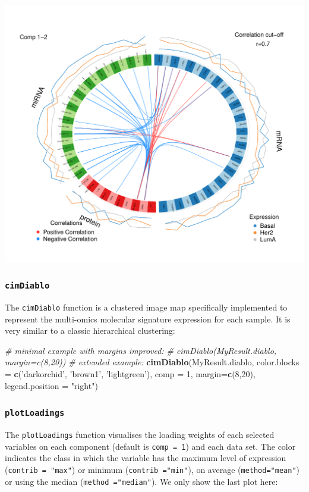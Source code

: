 \documentclass[]{book}
\newenvironment{Shaded}{\begin{snugshade}}{\end{snugshade}}
\newcommand{\CommentTok}[1]{\textcolor[rgb]{0.56,0.35,0.01}{\textit{#1}}}
\newcommand{\DataTypeTok}[1]{\textcolor[rgb]{0.13,0.29,0.53}{#1}}
\newcommand{\DecValTok}[1]{\textcolor[rgb]{0.00,0.00,0.81}{#1}}
\newcommand{\KeywordTok}[1]{\textcolor[rgb]{0.13,0.29,0.53}{\textbf{#1}}}
\newcommand{\NormalTok}[1]{#1}
\newcommand{\StringTok}[1]{\textcolor[rgb]{0.31,0.60,0.02}{#1}}
\begin{document}
\begin{center}\includegraphics[width=0.5\linewidth,]{Figures/06-diablo-circosPlot-1} \end{center}

\hypertarget{cimdiablo}{%
\subsubsection{\texorpdfstring{\texttt{cimDiablo}}{cimDiablo}}\label{cimdiablo}}

The \texttt{cimDiablo} function is a clustered image map specifically implemented to represent the multi-omics molecular signature expression for each sample. It is very similar to a classic hierarchical clustering:

\begin{Shaded}
\begin{Highlighting}[]
\CommentTok{# minimal example with margins improved:}
\CommentTok{# cimDiablo(MyResult.diablo, margin=c(8,20))}
\CommentTok{# extended example:}
\KeywordTok{cimDiablo}\NormalTok{(MyResult.diablo, }\DataTypeTok{color.blocks =} \KeywordTok{c}\NormalTok{(}\StringTok{'darkorchid'}\NormalTok{, }\StringTok{'brown1'}\NormalTok{, }\StringTok{'lightgreen'}\NormalTok{), }\DataTypeTok{comp =} \DecValTok{1}\NormalTok{, }\DataTypeTok{margin=}\KeywordTok{c}\NormalTok{(}\DecValTok{8}\NormalTok{,}\DecValTok{20}\NormalTok{), }\DataTypeTok{legend.position =} \StringTok{"right"}\NormalTok{)}
\end{Highlighting}
\end{Shaded}

\hypertarget{plotloadings}{%
\subsubsection{\texorpdfstring{\texttt{plotLoadings}}{plotLoadings}}\label{plotloadings}}

The \texttt{plotLoadings} function visualises the loading weights of each selected variables on each component (default is \texttt{comp\ =\ 1}) and each data set. The color indicates the class in which the variable has the maximum level of expression (\texttt{contrib\ =\ "max"}) or minimum (\texttt{contrib\ ="min"}), on average (\texttt{method="mean"}) or using the median (\texttt{method\ ="median"}). We only show the last plot here:
\end{document}
